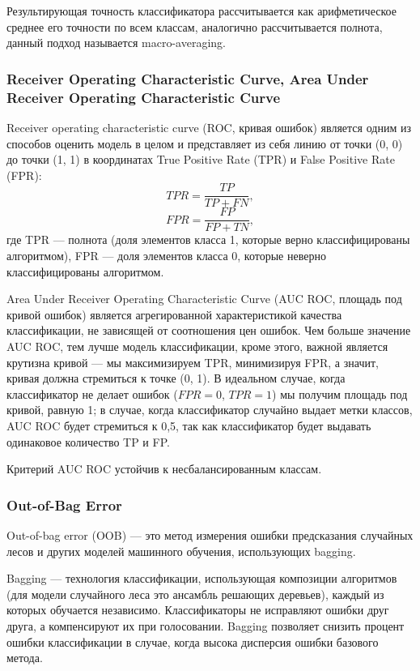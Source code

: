 \documentclass[14pt, a4paper, oneside]{extarticle}
\begin{document}
Результирующая точность классификатора рассчитывается как арифметическое среднее его точности по всем классам, аналогично рассчитывается полнота, данный подход называется macro-averaging.

\subsubsection{Receiver Operating Characteristic Curve, Area Under Receiver Operating Characteristic Curve}
Receiver operating characteristic curve (ROC, кривая ошибок) является одним из способов оценить модель в целом и представляет из себя линию от точки (0, 0) до точки (1, 1) в координатах True Positive Rate (TPR) и False Positive Rate (FPR):
$$TPR = \frac{TP}{TP+FN},$$
$$FPR = \frac{FP}{FP+TN},$$
где TPR --- полнота (доля элементов класса 1, которые верно классифицированы алгоритмом), FPR --- доля элементов класса 0, которые неверно классифицированы алгоритмом.

Area Under Receiver Operating Characteristic Curve (AUC ROC, площадь под кривой ошибок) является агрегированной характеристикой качества классификации, не зависящей от соотношения цен ошибок. Чем больше значение AUC ROC, тем лучше модель классификации, кроме этого, важной является крутизна кривой --- мы максимизируем TPR, минимизируя FPR, а значит, кривая должна стремиться к точке (0, 1). В идеальном случае, когда классификатор не делает ошибок ($FPR = 0$, $TPR = 1$) мы получим площадь под кривой, равную 1; в случае, когда классификатор случайно выдает метки классов, AUC ROC будет стремиться к 0,5, так как классификатор будет выдавать одинаковое количество TP и FP.

Критерий AUC ROC устойчив к несбалансированным классам.

\subsubsection{Out-of-Bag Error}
Out-of-bag error (OOB) --- это метод измерения ошибки предсказания случайных лесов и других моделей машинного обучения, использующих bagging.

Bagging --- технология классификации, использующая композиции алгоритмов (для модели случайного леса это ансамбль решающих деревьев), каждый из которых обучается независимо. Классификаторы не исправляют ошибки друг друга, а компенсируют их при голосовании. Bagging позволяет снизить процент ошибки классификации в случае, когда высока дисперсия ошибки базового метода.
\end{document}
